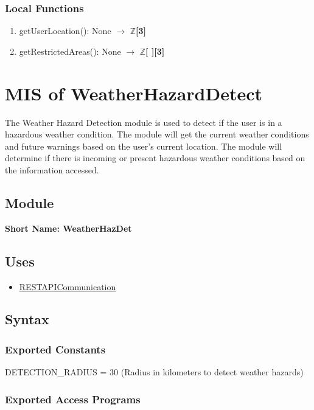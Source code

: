 \documentclass[12pt, titlepage]{article}
\begin{document}
\subsubsection{Local Functions}

\begin{enumerate}
  \item getUserLocation(): None $\rightarrow$ $\mathbb{Z}$\textbf{[3]}
  \item getRestrictedAreas(): None $\rightarrow$ $\mathbb{Z}$\textbf{[ ]}\textbf{[3]}
\end{enumerate}

\section{MIS of WeatherHazardDetect} \label{weaather-haz}

The Weather Hazard Detection module is used to detect if the user is in a hazardous weather condition. The module will get the current weather conditions and future warnings based on the user's current location. The module will determine if there is incoming or present hazardous weather conditions based on the information accessed.

\subsection{Module}

\textbf{Short Name: WeatherHazDet}

\subsection{Uses}
\begin{itemize}
  \item \hyperref[rest-api]{RESTAPICommunication}
\end{itemize}

\subsection{Syntax}

\subsubsection{Exported Constants}
DETECTION\_RADIUS = 30 (Radius in kilometers to detect weather hazards)

\subsubsection{Exported Access Programs}
\end{document}
